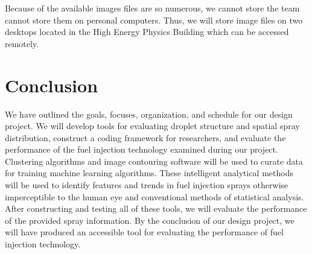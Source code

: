 \documentclass[12pt]{amsart}
\begin{document}
Because of the available images files are so numerous, we cannot store the team cannot store them on personal computers. Thus, we will store image files on two desktops located in the High Energy Physics Building which can be accessed remotely. 

\section*{Conclusion}

We have outlined the goals, focuses, organization, and schedule for our design project. We will develop tools for evaluating droplet structure and spatial spray distribution, construct a coding framework for researchers, and evaluate the performance of the fuel injection technology examined during our project. Clustering algorithms and image contouring software will be used to curate data for training machine learning algorithms. These intelligent analytical methods will be used to identify features and trends in fuel injection sprays otherwise imperceptible to the human eye and conventional methods of statistical analysis. After constructing and testing all of these tools, we will evaluate the performance of the provided spray information. By the conclusion of our design project, we will have produced an accessible tool for evaluating the performance of fuel injection technology. 
\end{document}
